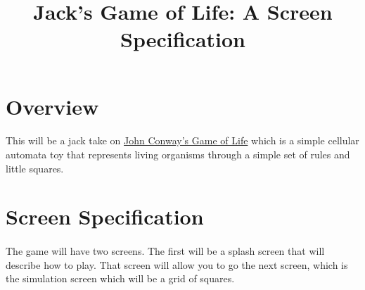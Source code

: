 \documentclass[12pt, titlepage]{article}
\title{Jack's Game of Life: A Screen Specification}
\begin{document}
\maketitle

\section{Overview}
\paragraph{}
This will be a jack take on \href{http://www.bitstorm.org/gameoflife/}{John Conway's Game of Life} which is a simple cellular automata toy that represents living organisms through a simple set of rules and little squares.

\section{Screen Specification}
\paragraph{}
The game will have two screens. The first will be a splash screen that will describe how to play. That screen will allow you to go the next screen, which is the simulation screen which will be a grid of squares.
\end{document}
